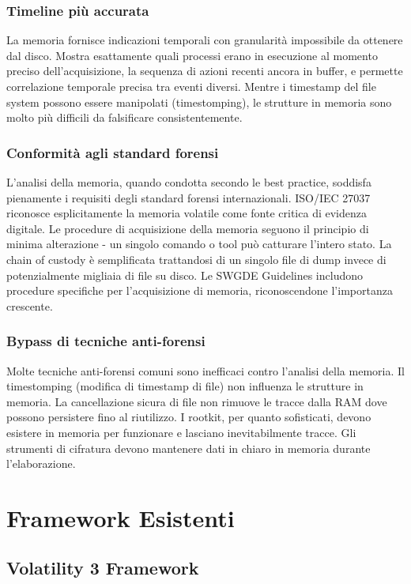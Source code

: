 \subsubsection{Timeline più accurata}
La memoria fornisce indicazioni temporali con granularità impossibile da ottenere dal disco. Mostra esattamente quali processi erano in esecuzione al momento preciso dell'acquisizione, la sequenza di azioni recenti ancora in buffer, e permette correlazione temporale precisa tra eventi diversi. Mentre i timestamp del file system possono essere manipolati (timestomping), le strutture in memoria sono molto più difficili da falsificare consistentemente.

\subsubsection{Conformità agli standard forensi}
L'analisi della memoria, quando condotta secondo le best practice, soddisfa pienamente i requisiti degli standard forensi internazionali. ISO/IEC 27037 \cite{iso27037} riconosce esplicitamente la memoria volatile come fonte critica di evidenza digitale. Le procedure di acquisizione della memoria seguono il principio di minima alterazione - un singolo comando o tool può catturare l'intero stato. La chain of custody è semplificata trattandosi di un singolo file di dump invece di potenzialmente migliaia di file su disco. Le SWGDE Guidelines \cite{swgde2022} includono procedure specifiche per l'acquisizione di memoria, riconoscendone l'importanza crescente.

\subsubsection{Bypass di tecniche anti-forensi}
Molte tecniche anti-forensi comuni sono inefficaci contro l'analisi della memoria. Il timestomping (modifica di timestamp di file) non influenza le strutture in memoria. La cancellazione sicura di file non rimuove le tracce dalla RAM dove possono persistere fino al riutilizzo. I rootkit, per quanto sofisticati, devono esistere in memoria per funzionare e lasciano inevitabilmente tracce. Gli strumenti di cifratura devono mantenere dati in chiaro in memoria durante l'elaborazione.

\section{Framework Esistenti}

\subsection{Volatility 3 Framework}


